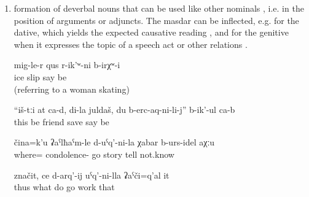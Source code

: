 \begin{enumerate}
	\item	formation of deverbal nouns that can be used like other nominals , i.e. in the position of arguments or adjuncts. The masdar can be inflected, e.g. for the dative, which yields the expected causative reading , and for the genitive when it expresses the topic of a speech act  or other relations .
	\begin{exe}
		\ex	\label{ex:‎‎‎There was skating on the ice. (referring to a woman skating)}
		\gll	mig-le-r	qus	r-ik'ʷ-ni	b-irχʷ-i\\
			ice	slip	say	be\\
		\glt	{} (referring to a woman skating)

		\ex	\label{ex:‎‎‎These (gems) are for you, my friend, because you saved me, said the bear}
		\gll	``iš-tːi	at	ca-d,	di-la	juldaš,		du	b-erc-aq-ni-li-j''	b-ik'-ul	ca-b\\
			this		be		friend			\tsc{n-}save		say	be\\
		\glt	{}

		\ex	\label{ex:‎‎‎I don't know if I should tell you the story about how we went somewhere}
		\gll	čina=k'u	ʡaˁlħaˁm-le	d-uˁq'-ni-la		χabar	b-urs-idel	aχːu\\
			where=	condolence-	go	story	tell	not.know\\
		\glt	{}

		\ex	\label{ex:What to do, this pasturing (lit. the work of going after the animals) is work}
		\gll	značit,	ce	d-arq'-ij	uˁq'-ni-lla	ʡaˁči=q'al	it\\
			thus	what	do	go	work	that\\
		\glt	{}
	\end{exe}	
\end{enumerate}


